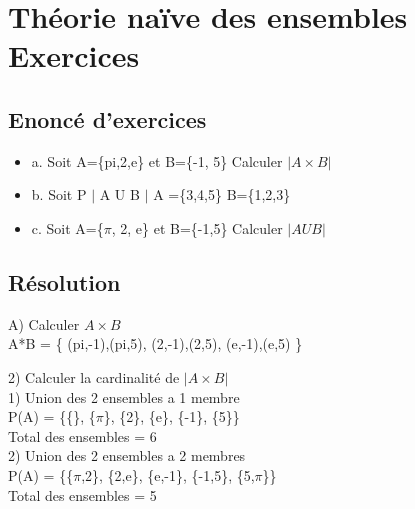 \newpage

\section{Théorie naïve des ensembles Exercices}
\vspace{5mm} %

\subsection{Enoncé d'exercices}
\vspace{3mm} %

\begin{itemize}
\item {a. Soit A=\{pi,2,e\} et B=\{-1, 5\} Calculer ${|A\times B|}$}
\item {b. Soit P $|$ A U B $|$ A =\{3,4,5\} B=\{1,2,3\}}
\item {c. Soit A=\{$\pi$, 2, e\} et B=\{-1,5\} Calculer $|A U B|$}
\end{itemize}

\subsection{Résolution}
\vspace{4mm} %

A) Calculer ${A\times B}$ \\

A*B = \{ (pi,-1),(pi,5), (2,-1),(2,5), (e,-1),(e,5) \}

\vspace{8mm} %

2) Calculer la cardinalité de ${|A\times B|}$ \\

1) Union des 2 ensembles a 1 membre \\

P(A) = \{\{\}, \{$\pi$\}, \{2\}, \{e\}, \{-1\}, \{5\}\} \\

Total des ensembles = 6 \\

2) Union des 2 ensembles a 2 membres \\

P(A) = \{\{$\pi$,2\}, \{2,e\}, \{e,-1\}, \{-1,5\}, \{5,$\pi$\}\} \\

Total des ensembles = 5 \\

